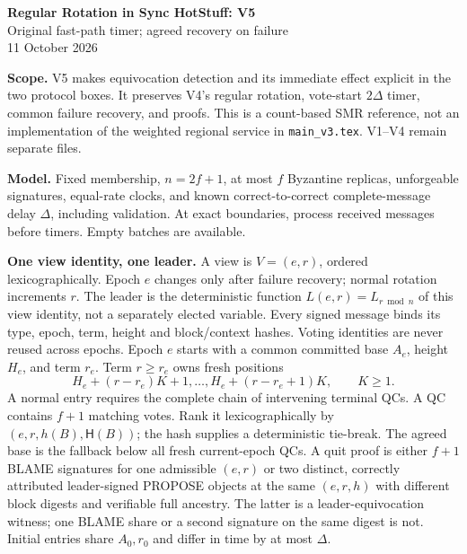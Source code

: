\documentclass[10pt,a4paper]{article}
\begin{document}
\begin{center}
{\Large\bfseries Regular Rotation in Sync HotStuff: V5}\\[3pt]
{\large Original fast-path timer; agreed recovery on failure}\\[3pt]
11 October 2026
\end{center}

\textbf{Scope.} V5 makes equivocation detection and its immediate effect
explicit in the two protocol boxes. It preserves V4's regular rotation,
vote-start $2\Delta$ timer, common failure recovery, and proofs.
This is a count-based SMR reference, not an implementation of the weighted
regional service in \texttt{main\_v3.tex}. V1--V4 remain separate files.

\textbf{Model.} Fixed membership, $n=2f+1$, at most $f$ Byzantine replicas,
unforgeable signatures, equal-rate clocks, and known correct-to-correct
complete-message delay $\Delta$, including validation. At exact boundaries,
process received messages before timers. Empty batches are available.

\textbf{One view identity, one leader.} A view is $V=(e,r)$, ordered
lexicographically. Epoch $e$ changes only after failure recovery; normal
rotation increments $r$. The leader is the deterministic function
$L(e,r)=L_{r\bmod n}$ of this view identity, not a separately elected variable.
Every signed message binds its type, epoch, term, height and block/context
hashes. Voting identities are never reused across epochs.
Epoch $e$ starts with a common committed base $A_e$, height $H_e$, and term
$r_e$. Term $r\ge r_e$ owns fresh positions
\[
 H_e+(r-r_e)K+1,\ldots,H_e+(r-r_e+1)K,\qquad K\ge1.
\]
A normal entry requires the complete chain of intervening terminal QCs.
A QC contains $f+1$ matching votes. Rank it lexicographically by
$(e,r,h(B),\mathsf{H}(B))$; the hash supplies a deterministic tie-break.
The agreed base is the fallback below all fresh current-epoch QCs.
A quit proof is either $f+1$ BLAME signatures for one admissible $(e,r)$
or two distinct, correctly attributed leader-signed PROPOSE objects at the
same $(e,r,h)$ with different block digests and verifiable full ancestry.
The latter is a leader-equivocation witness; one BLAME share or a second
signature on the same digest is not. Initial entries share $A_0,r_0$ and
differ in time by at most $\Delta$.
\end{document}
